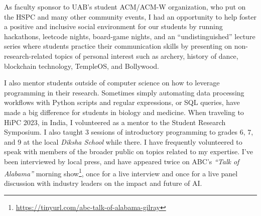 \documentclass[12pt]{article}
\begin{document}
As faculty sponsor to UAB's student ACM/ACM-W organization, who put on the HSPC and many other community events, I had an opportunity to help foster a positive and inclusive social environment for our students by running hackathons, leetcode nights, board-game nights, and an ``undistinguished'' lecture series where students practice their communication skills by presenting on non-research-related topics of personal interest such as archery, history of dance, blockchain technology, TempleOS, and Bollywood.

I also mentor students outside of computer science on how to leverage programming in their research. Sometimes simply automating data processing workflows with Python scripts and regular expressions, or SQL queries, have made a big difference for students in biology and medicine. When traveling to HiPC 2023, in India, I volunteered as a mentor to the Student Research Symposium. I also taught 3 sessions of introductory programming to grades 6, 7, and 9 at the local \emph{Diksha School} while there. I have frequently volunteered to speak with members of the broader public on topics related to my expertise. I've been interviewed by local press, and have appeared twice on ABC's \emph{``Talk of Alabama''} morning show\footnote{\url{https://tinyurl.com/abc-talk-of-alabama-gilray}}, once for a live interview and once for a live panel discussion with industry leaders on the impact and future of AI. 
\end{document}
